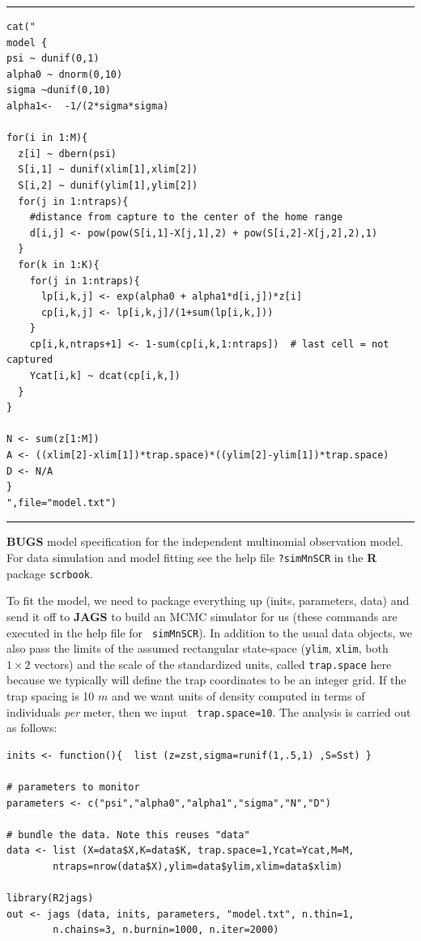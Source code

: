 \begin{panel}[htp]
\centering
\rule[0.15in]{\textwidth}{.03in}
{\small
\begin{verbatim}
cat("
model {
psi ~ dunif(0,1)
alpha0 ~ dnorm(0,10)
sigma ~dunif(0,10)
alpha1<-  -1/(2*sigma*sigma)

for(i in 1:M){
  z[i] ~ dbern(psi)
  S[i,1] ~ dunif(xlim[1],xlim[2])
  S[i,2] ~ dunif(ylim[1],ylim[2])
  for(j in 1:ntraps){
    #distance from capture to the center of the home range
    d[i,j] <- pow(pow(S[i,1]-X[j,1],2) + pow(S[i,2]-X[j,2],2),1)
  }
  for(k in 1:K){
    for(j in 1:ntraps){
      lp[i,k,j] <- exp(alpha0 + alpha1*d[i,j])*z[i]
      cp[i,k,j] <- lp[i,k,j]/(1+sum(lp[i,k,]))
    }
    cp[i,k,ntraps+1] <- 1-sum(cp[i,k,1:ntraps])  # last cell = not captured
    Ycat[i,k] ~ dcat(cp[i,k,])
  }
}

N <- sum(z[1:M])
A <- ((xlim[2]-xlim[1])*trap.space)*((ylim[2]-ylim[1])*trap.space)
D <- N/A
}
",file="model.txt")

\end{verbatim}
}
\rule[-0.15in]{\textwidth}{.03in}
\caption{
{\bf BUGS} model specification for the independent multinomial
observation model. For data simulation and model fitting see the
help file \mbox{\tt ?simMnSCR} in the {\bf R} package \mbox{\tt scrbook}.
}
\label{poisson-mn.panel.mn}
\end{panel}

To fit the model, we need to package everything up (inits, parameters,
data) and send it off to \mbox{\bf JAGS} to build an MCMC simulator
for us (these commands are executed in the help file for \mbox{\tt
  simMnSCR}). In addition to the usual data objects, we also pass
the limits of the assumed rectangular state-space (\mbox{\tt ylim},
\mbox{\tt xlim}, both $1 \times 2$ vectors) and the scale of the
standardized units, called \mbox{\tt trap.space} here because we
typically will define the trap coordinates to be an integer grid. If
the trap spacing is 10 $m$ and we want units of density computed in
terms of individuals {\it per} meter, then we input \mbox{\tt
  trap.space=10}. The analysis is carried out as follows: 
{\small
\begin{verbatim}
inits <- function(){  list (z=zst,sigma=runif(1,.5,1) ,S=Sst) }

# parameters to monitor
parameters <- c("psi","alpha0","alpha1","sigma","N","D")

# bundle the data. Note this reuses "data"
data <- list (X=data$X,K=data$K, trap.space=1,Ycat=Ycat,M=M,
        ntraps=nrow(data$X),ylim=data$ylim,xlim=data$xlim)

library(R2jags)
out <- jags (data, inits, parameters, "model.txt", n.thin=1,
        n.chains=3, n.burnin=1000, n.iter=2000)
\end{verbatim}
}

